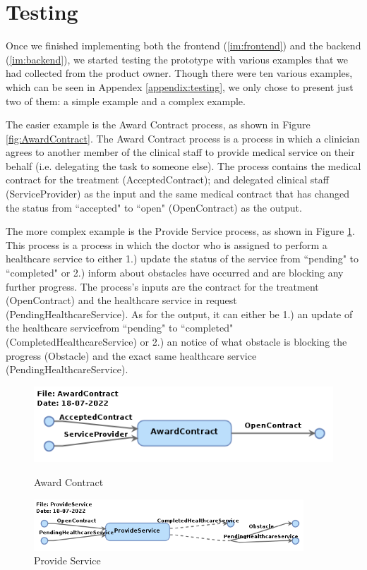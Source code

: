 \section{Testing}
Once we finished implementing both the frontend (\ref{im:frontend}) and the backend (\ref{im:backend}), we started testing the prototype with various examples that we had collected from the product owner. Though there were ten various examples, which can be seen in Appendex \ref{appendix:testing}, we only chose to present just two of them: a simple example and a complex example.

The easier example is the Award Contract process, as shown in Figure \ref{fig:AwardContract}. The Award Contract process is a process in which a clinician agrees to another member of the clinical staff to provide medical service on their behalf (i.e. delegating the task to someone else). The process contains the medical contract for the treatment (AcceptedContract); and delegated clinical staff (ServiceProvider) as the input and the same medical contract that has changed the status from ``accepted" to ``open" (OpenContract) as the output.

The more complex example is the Provide Service process, as shown in Figure \ref{fig:ProvideService}. This process is a process in which the doctor who is assigned to perform a healthcare service to either 1.) update the status of the service from ``pending" to ``completed" or 2.) inform about obstacles have occurred and are blocking any further progress. The process's inputs are the contract for the treatment (OpenContract) and the healthcare service in request (PendingHealthcareService). As for the output, it can either be 1.) an update of the healthcare servicefrom ``pending" to ``completed" (CompletedHealthcareService) or 2.) an notice of what obstacle is blocking the progress (Obstacle) and the exact same healthcare service (PendingHealthcareService).


\begin{figure}[ht!]
\centering
\begin{minipage}{.45\textwidth}
  \centering
    \includegraphics[width=0.9\linewidth]{overleaf/images/testing/AwardContract.png}
    \caption{Award Contract}
    \label{fig:AwardContract}
\end{minipage}%
\begin{minipage}{.55\textwidth}
  \centering
  \includegraphics[width=0.9\textwidth]{overleaf/images/testing/ProvideService.png}
  \caption{Provide Service}
  \label{fig:ProvideService}
\end{minipage}
\end{figure}


